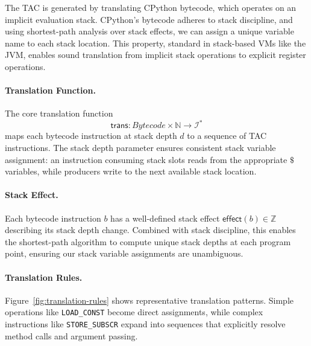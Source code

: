 The TAC is generated by translating CPython bytecode, which operates on an implicit evaluation stack. CPython's bytecode adheres to stack discipline, and using shortest-path analysis over stack effects, we can assign a unique variable name to each stack location. This property, standard in stack-based VMs like the JVM, enables sound translation from implicit stack operations to explicit register operations.

\paragraph{Translation Function.}
The core translation function
\[
\mathsf{trans} : Bytecode \times \mathbb{N} \to \mathcal{I}^*
\]
maps each bytecode instruction at stack depth $d$ to a sequence of TAC instructions. The stack depth parameter ensures consistent stack variable assignment: an instruction consuming stack slots reads from the appropriate $\$$ variables, while producers write to the next available stack location.

\paragraph{Stack Effect.}
Each bytecode instruction $b$ has a well-defined stack effect $\mathsf{effect}(b) \in \mathbb{Z}$ describing its stack depth change. Combined with stack discipline, this enables the shortest-path algorithm to compute unique stack depths at each program point, ensuring our stack variable assignments are unambiguous.

\paragraph{Translation Rules.}
Figure~\ref{fig:translation-rules} shows representative translation patterns. Simple operations like \texttt{LOAD\_CONST} become direct assignments, while complex instructions like \texttt{STORE\_SUBSCR} expand into sequences that explicitly resolve method calls and argument passing.


